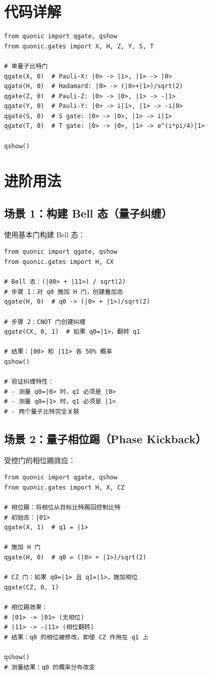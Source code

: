 \documentclass[12pt,a4paper]{article}
\begin{document}
\section{代码详解}

\begin{verbatim}
from quonic import qgate, qshow
from quonic.gates import X, H, Z, Y, S, T

# 单量子比特门
qgate(X, 0)  # Pauli-X: |0> -> |1>, |1> -> |0>
qgate(H, 0)  # Hadamard: |0> -> (|0>+|1>)/sqrt(2)
qgate(Z, 0)  # Pauli-Z: |0> -> |0>, |1> -> -|1>
qgate(Y, 0)  # Pauli-Y: |0> -> i|1>, |1> -> -i|0>
qgate(S, 0)  # S gate: |0> -> |0>, |1> -> i|1>
qgate(T, 0)  # T gate: |0> -> |0>, |1> -> e^(i*pi/4)|1>

qshow()
\end{verbatim}

\section{进阶用法}

\subsection{场景 1：构建 Bell 态（量子纠缠）}

使用基本门构建 Bell 态：

\begin{verbatim}
from quonic import qgate, qshow
from quonic.gates import H, CX

# Bell 态：(|00> + |11>) / sqrt(2)
# 步骤 1：对 q0 施加 H 门，创建叠加态
qgate(H, 0)  # q0 -> (|0> + |1>)/sqrt(2)

# 步骤 2：CNOT 门创建纠缠
qgate(CX, 0, 1)  # 如果 q0=|1>，翻转 q1

# 结果：|00> 和 |11> 各 50% 概率
qshow()

# 验证纠缠特性：
# - 测量 q0=|0> 时，q1 必须是 |0>
# - 测量 q0=|1> 时，q1 必须是 |1>
# - 两个量子比特完全关联
\end{verbatim}

\subsection{场景 2：量子相位踢（Phase Kickback）}

受控门的相位踢效应：

\begin{verbatim}
from quonic import qgate, qshow
from quonic.gates import H, X, CZ

# 相位踢：将相位从目标比特踢回控制比特
# 初始态：|01>
qgate(X, 1)  # q1 = |1>

# 施加 H 门
qgate(H, 0)  # q0 = (|0> + |1>)/sqrt(2)

# CZ 门：如果 q0=|1> 且 q1=|1>，施加相位
qgate(CZ, 0, 1)

# 相位踢效果：
# |01> -> |01> (无相位)
# |11> -> -|11> (相位翻转)
# 结果：q0 的相位被修改，即使 CZ 作用在 q1 上

qshow()
# 测量结果：q0 的概率分布改变
\end{verbatim}
\end{document}
